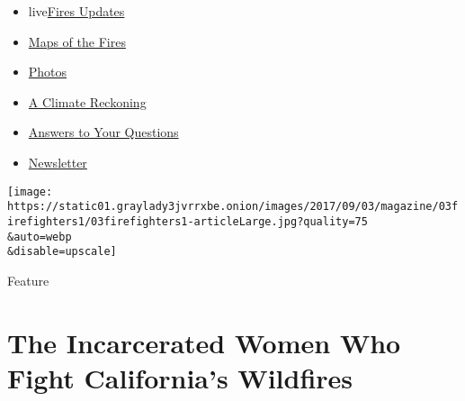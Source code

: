 \begin{itemize}
\tightlist
\item
  live\href{https://www.nytimes3xbfgragh.onion/2020/09/12/us/wildfires-live-updates.html?name=styln-california-wildfires\&region=TOP_BANNER\&block=storyline_menu_recirc\&action=click\&pgtype=Article\&impression_id=8da7f381-f529-11ea-a612-19c737f1de2c\&variant=undefined}{Fires
  Updates}
\item
  \href{https://www.nytimes3xbfgragh.onion/interactive/2020/us/fires-map-tracker.html?name=styln-california-wildfires\&region=TOP_BANNER\&block=storyline_menu_recirc\&action=click\&pgtype=Article\&impression_id=8da81a90-f529-11ea-a612-19c737f1de2c\&variant=undefined}{Maps
  of the Fires}
\item
  \href{https://www.nytimes3xbfgragh.onion/article/wildfires-photos-california-oregon-washington-state.html?name=styln-california-wildfires\&region=TOP_BANNER\&block=storyline_menu_recirc\&action=click\&pgtype=Article\&impression_id=8da81a91-f529-11ea-a612-19c737f1de2c\&variant=undefined}{Photos}
\item
  \href{https://www.nytimes3xbfgragh.onion/2020/09/10/us/climate-change-california-wildfires.html?name=styln-california-wildfires\&region=TOP_BANNER\&block=storyline_menu_recirc\&action=click\&pgtype=Article\&impression_id=8da81a92-f529-11ea-a612-19c737f1de2c\&variant=undefined}{A
  Climate Reckoning}
\item
  \href{https://www.nytimes3xbfgragh.onion/article/wildfires-california-oregon-washington.html?name=styln-california-wildfires\&region=TOP_BANNER\&block=storyline_menu_recirc\&action=click\&pgtype=Article\&impression_id=8da81a93-f529-11ea-a612-19c737f1de2c\&variant=undefined}{Answers
  to Your Questions}
\item
  \href{https://www.nytimes3xbfgragh.onion/2020/09/09/us/california-wildfires.html?name=styln-california-wildfires\&region=TOP_BANNER\&block=storyline_menu_recirc\&action=click\&pgtype=Article\&impression_id=8da81a94-f529-11ea-a612-19c737f1de2c\&variant=undefined}{Newsletter}
\end{itemize}

\texttt{[image: https://static01.graylady3jvrrxbe.onion/images/2017/09/03/magazine/03firefighters1/03firefighters1-articleLarge.jpg?quality=75\\\&auto=webp\\\&disable=upscale]}

Feature

\hypertarget{the-incarcerated-women-who-fight-californias-wildfires}{%
\section{The Incarcerated Women Who Fight California's
Wildfires}\label{the-incarcerated-women-who-fight-californias-wildfires}}


